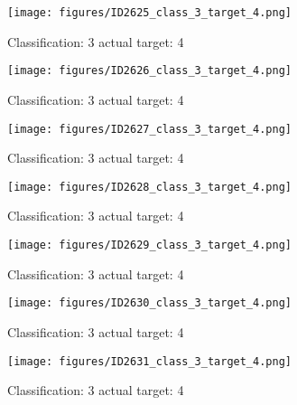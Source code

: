 \begin{figure}[h!]
\begin{center}
\texttt{[image: figures/ID2625\_class\_3\_target\_4.png]}
\end{center}
\caption{ Classification: 3 actual target: 4}
\label{fig:ID2625_class_3_target_4}
\end{figure}
\begin{figure}[h!]
\begin{center}
\texttt{[image: figures/ID2626\_class\_3\_target\_4.png]}
\end{center}
\caption{ Classification: 3 actual target: 4}
\label{fig:ID2626_class_3_target_4}
\end{figure}
\begin{figure}[h!]
\begin{center}
\texttt{[image: figures/ID2627\_class\_3\_target\_4.png]}
\end{center}
\caption{ Classification: 3 actual target: 4}
\label{fig:ID2627_class_3_target_4}
\end{figure}
\begin{figure}[h!]
\begin{center}
\texttt{[image: figures/ID2628\_class\_3\_target\_4.png]}
\end{center}
\caption{ Classification: 3 actual target: 4}
\label{fig:ID2628_class_3_target_4}
\end{figure}
\begin{figure}[h!]
\begin{center}
\texttt{[image: figures/ID2629\_class\_3\_target\_4.png]}
\end{center}
\caption{ Classification: 3 actual target: 4}
\label{fig:ID2629_class_3_target_4}
\end{figure}
\begin{figure}[h!]
\begin{center}
\texttt{[image: figures/ID2630\_class\_3\_target\_4.png]}
\end{center}
\caption{ Classification: 3 actual target: 4}
\label{fig:ID2630_class_3_target_4}
\end{figure}
\begin{figure}[h!]
\begin{center}
\texttt{[image: figures/ID2631\_class\_3\_target\_4.png]}
\end{center}
\caption{ Classification: 3 actual target: 4}
\label{fig:ID2631_class_3_target_4}
\end{figure}
